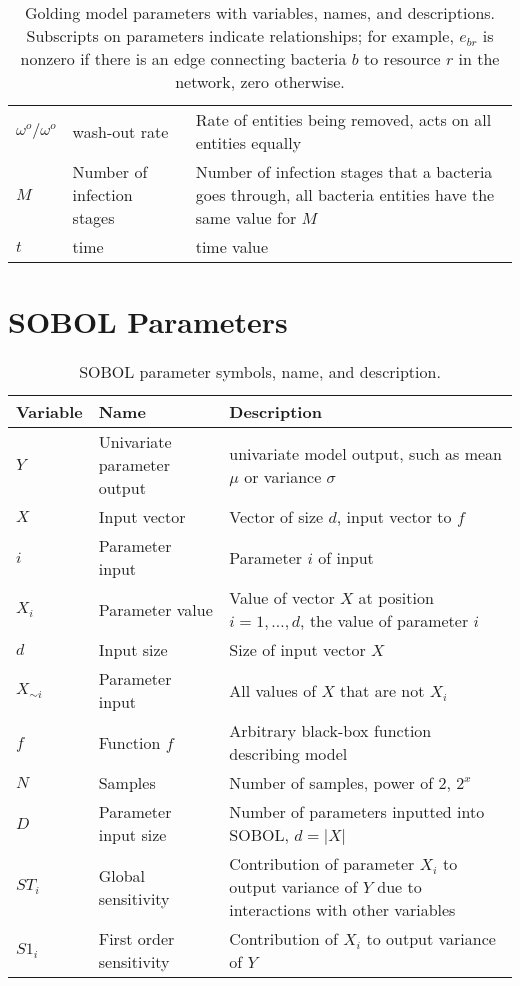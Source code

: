 \begin{table}[h!]
\begin{tabularx}{\textwidth}{l l X}
        $\omega^o / \omega^o$ & wash-out rate & Rate of entities being removed, acts on all entities equally\\
        $M$ & Number of infection stages & Number of infection stages that a bacteria goes through, all bacteria entities have the same value for $M$\\
        $t$ & time & time value \\
        \bottomrule
    \end{tabularx}\newline
    \caption{
        Golding model parameters with variables, names, and descriptions. 
        Subscripts on parameters indicate relationships; for example, $e_{b r}$ is nonzero if there is an edge connecting bacteria $b$ to resource $r$ in the network, zero otherwise.
    }
    \label{tab:appendixA:parameter_table_simple_golding_model}
\end{table}


\section{SOBOL Parameters}
\begin{table}[h!]
    \small %
    \centering
    \begin{tabularx}{\textwidth}{l l X}
        \toprule
        \textbf{Variable} & \textbf{Name} & \textbf{Description} \\
        \midrule
        $Y$ & Univariate parameter output & univariate model output, such as mean $\mu$ or variance $\sigma$ \\
        $X$ & Input vector & Vector of size $d$, input vector to $f$ \\
        $i$ & Parameter input & Parameter $i$ of input \\
        $X_i$ & Parameter value & Value of vector $X$ at position $i=1, \dots, d$, the value of parameter $i$ \\
        $d$ & Input size & Size of input vector $X$ \\
        $X_{\sim i}$ & Parameter input & All values of $X$ that are not $X_i$ \\
        $f$ & Function $f$ & Arbitrary black-box function describing model \\
        $N$ & Samples & Number of samples, power of 2, $2^x$ \\
        $D$ & Parameter input size & Number of parameters inputted into SOBOL, $d=|X|$ \\
        $ST_i$ & Global sensitivity & Contribution of parameter $X_i$ to output variance of $Y$ due to interactions with other variables \\
        $S1_i$ & First order sensitivity & Contribution of $X_i$ to output variance of $Y$ \\
        \bottomrule
    \end{tabularx} \newline
    \caption{
        SOBOL parameter symbols, name, and description.
    }
    \label{tab:appendixA:parameter_table_SOBOL}
\end{table}

